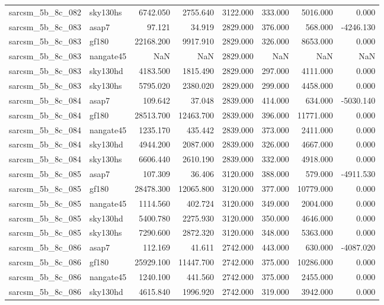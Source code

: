 \begin{tabular}{llrrrrrr}
sarcsm\_5b\_8c\_082 & sky130hs & 6742.050 & 2755.640 & 3122.000 & 333.000 & 5016.000 & 0.000 \\
sarcsm\_5b\_8c\_083 & asap7 & 97.121 & 34.919 & 2829.000 & 376.000 & 568.000 & -4246.130 \\
sarcsm\_5b\_8c\_083 & gf180 & 22168.200 & 9917.910 & 2829.000 & 326.000 & 8653.000 & 0.000 \\
sarcsm\_5b\_8c\_083 & nangate45 & NaN & NaN & 2829.000 & NaN & NaN & NaN \\
sarcsm\_5b\_8c\_083 & sky130hd & 4183.500 & 1815.490 & 2829.000 & 297.000 & 4111.000 & 0.000 \\
sarcsm\_5b\_8c\_083 & sky130hs & 5795.020 & 2380.020 & 2829.000 & 299.000 & 4458.000 & 0.000 \\
sarcsm\_5b\_8c\_084 & asap7 & 109.642 & 37.048 & 2839.000 & 414.000 & 634.000 & -5030.140 \\
sarcsm\_5b\_8c\_084 & gf180 & 28513.700 & 12463.700 & 2839.000 & 396.000 & 11771.000 & 0.000 \\
sarcsm\_5b\_8c\_084 & nangate45 & 1235.170 & 435.442 & 2839.000 & 373.000 & 2411.000 & 0.000 \\
sarcsm\_5b\_8c\_084 & sky130hd & 4944.200 & 2087.000 & 2839.000 & 326.000 & 4667.000 & 0.000 \\
sarcsm\_5b\_8c\_084 & sky130hs & 6606.440 & 2610.190 & 2839.000 & 332.000 & 4918.000 & 0.000 \\
sarcsm\_5b\_8c\_085 & asap7 & 107.309 & 36.406 & 3120.000 & 388.000 & 579.000 & -4911.530 \\
sarcsm\_5b\_8c\_085 & gf180 & 28478.300 & 12065.800 & 3120.000 & 377.000 & 10779.000 & 0.000 \\
sarcsm\_5b\_8c\_085 & nangate45 & 1114.560 & 402.724 & 3120.000 & 349.000 & 2004.000 & 0.000 \\
sarcsm\_5b\_8c\_085 & sky130hd & 5400.780 & 2275.930 & 3120.000 & 350.000 & 4646.000 & 0.000 \\
sarcsm\_5b\_8c\_085 & sky130hs & 7290.600 & 2872.320 & 3120.000 & 348.000 & 5363.000 & 0.000 \\
sarcsm\_5b\_8c\_086 & asap7 & 112.169 & 41.611 & 2742.000 & 443.000 & 630.000 & -4087.020 \\
sarcsm\_5b\_8c\_086 & gf180 & 25929.100 & 11447.700 & 2742.000 & 375.000 & 10286.000 & 0.000 \\
sarcsm\_5b\_8c\_086 & nangate45 & 1240.100 & 441.560 & 2742.000 & 375.000 & 2455.000 & 0.000 \\
sarcsm\_5b\_8c\_086 & sky130hd & 4615.840 & 1996.920 & 2742.000 & 319.000 & 3942.000 & 0.000 \\

\end{tabular}

